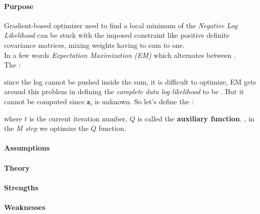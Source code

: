 \paragraph{Purpose}
Gradient-based optimizer used to find a local minimum of the \emph{Negative Log 
Likelihood} can be stuck with the imposed constraint like positive definite covariance
matrices, mixing weights having to sum to one.\\
In a few words \emph{Expectation Maximization (EM)} which alternates between .\\
The :
\begin{center}
\end{center}
since the log cannot be pushed inside the sum, it is difficult to optimize, EM gets 
around this problem in defining the \emph{complete data log likelihood} to be
. But it cannot be computed since $\bm{z}_{i}$ is unknown. So let's
define the :
\begin{center}
\end{center}
where $t$ is the current iteration number, $Q$ is called the \textbf{auxiliary 
function}. , in the \emph{M step} we optimize the $Q$ function.


\paragraph{Assumptions}
\paragraph{Theory}
\paragraph{Strengths}
\paragraph{Weaknesses}
